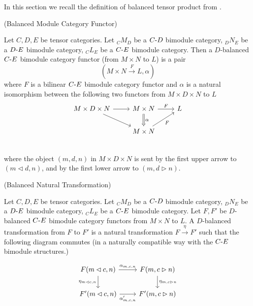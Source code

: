 \noindent In this section we recall the definition of balanced tensor product
from \cite{douglas/balanced-product}.

\begin{definition} (Balanced Module Category Functor)

  \noindent Let $C, D, E$ be tensor categories. Let $_{C}M_{D}$ be a
  $C{\text -}D$ bimodule category, $_{D}N_{E}$ be a $D{\text -}E$ bimodule
  category, $_{C}L_{E}$ be a $C{\text -}E$ bimodule category. \quad Then a
  $D$-balanced $C{\text -}E$ bimodule category functor (from $M \times N$ to $L$)
  is a pair
  \[(M \times N \xrightarrow{F} L, \alpha)\] where $F$ is a bilinear $C{\text -}E$
  bimodule category functor and $\alpha$ is a natural isomorphism between the
  following two functors from $M \times D \times N$ to $L$
  \[
    \begin{tikzcd}
      M \times D \times N \arrow[r] \arrow[dr] &
      M \times N \arrow[d, Rightarrow, "\alpha"] \arrow[r, "F"] &
      L \\
      & M \times N \arrow[ur, "F"'] \\
    \end{tikzcd}
  \]
  where the object $(m,d,n)$ in $M \times D \times N$ is sent by the first
  upper arrow to $(m \lhd d, n)$, and by the first lower arrow to $(m, d \rhd n)$.
\end{definition}


\begin{definition} (Balanced Natural Transformation)

  \noindent Let $C, D, E$ be tensor categories. Let $_{C}M_{D}$ be a $C{\text -}D$
  bimodule category, $_{D}N_{E}$ be a $D{\text -}E$ bimodule category, $_{C}L_{E}$ be
  a $C{\text -}E$ bimodule category. Let $F, F'$ be $D$-balanced $C{\text -}E$ bimodule
  category functors from $M \times N$ to $L$. A $D$-balanced transformation
  from $F$ to $F'$ is a natural transformation $ F \xrightarrow{\eta} F'$ such
  that the following diagram commutes (in a naturally compatible way with the
  $C{\text -}E$ bimodule structures.)

  \[
    \begin{tikzcd}
      F(m \lhd c, n) \arrow[r, "\alpha_{m,c,n}"] \arrow[d, "\eta_{m \lhd c, n}"'] &
      F(m, c \rhd n) \arrow[d, "\eta_{m, c \rhd n}"] \\
      F'(m \lhd c, n) \arrow[r, "\alpha_{m,c,n}'"'] &
      F'(m, c \rhd n)
    \end{tikzcd}
  \]
\end{definition}

